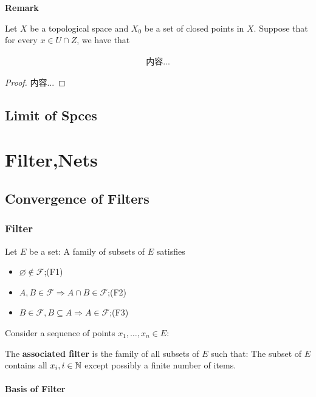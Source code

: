 \documentclass[Total.tex]{subfiles}
\begin{document}
			\textbf{Remark}
			
			\begin{lemma}
				Let $X$ be a topological space and $X_0$ be a set of closed points in $X$. Suppose that for every $x\in U\cap Z$, we have that
				
				\begin{gather*}
					内容...
				\end{gather*}
			\end{lemma}
			
			\begin{proof}
				内容...
			\end{proof}
			
		\section{Limit of Spces}
	\chapter{Filter,Nets}
		\section{Convergence of Filters}
			\subsection{Filter}
				\begin{Def}
					Let $E$ be a set: A family of subsets of $E$ satisfies
					\begin{itemize}
						\item $\varnothing\notin\mathcal{F}$;(F1)
						\item $A,B\in \mathcal{F}\Rightarrow A\cap B\in \mathcal{F}$;(F2)
						\item $B\in \mathcal{F},B\subseteq A\Rightarrow A\in \mathcal{F}$;(F3)
					\end{itemize}
				\end{Def}
				
				\begin{example}
					Consider a sequence of points $x_1,\dots,x_n\in E$:
					\begin{Def}
						The \textbf{associated filter} is the family of all subsets of $E$ such that: The subset of $E$ contains all $x_i,i\in \mathbb{N}$ except possibly a finite number of items.
					\end{Def}
				\end{example}
				
				\subsubsection{Basis of Filter}
				
\end{document}
